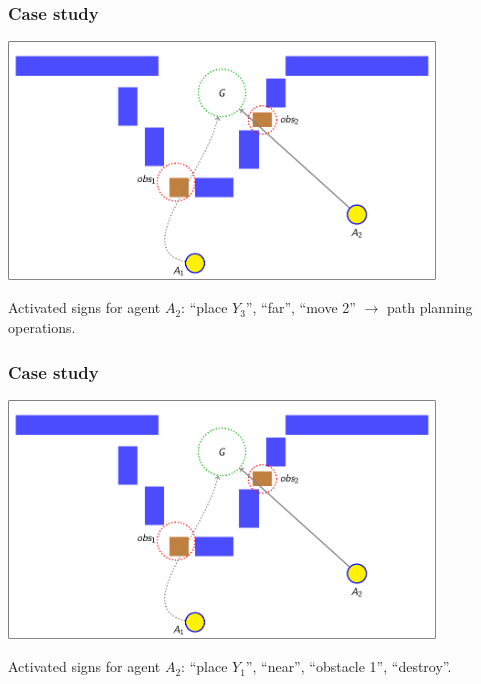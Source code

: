 \documentclass[default]{beamer}
\begin{document}
	\begin{frame}
		\frametitle{Case study}
		
		\begin{center}
			\includegraphics[page=58,width=0.85\textwidth]{examples/slides_colored}
		\end{center}
		\par\bigskip
		Activated signs for agent $A_2$: ``place $Y_3$'', ``far'', ``move 2'' $\rightarrow$ \color{red} path planning operations.
	\end{frame}
	
	\begin{frame}
		\frametitle{Case study}
		
		\begin{center}
			\includegraphics[page=95,width=0.85\textwidth]{examples/slides_colored}
		\end{center}
		\par\bigskip
		Activated signs for agent $A_2$: ``place $Y_1$'', ``near'', ``obstacle 1'', ``destroy''.
	\end{frame}
	
\end{document}
